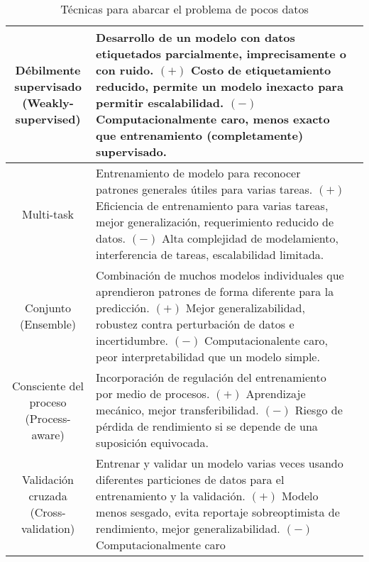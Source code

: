 \begin{center}
\begin{table}[ht!]
\begin{tabular}{ |c|m{9.5cm}|c| }
            \hline
            \makecell{Débilmente supervisado \\ (Weakly-supervised)} & Desarrollo de un modelo con datos etiquetados parcialmente, imprecisamente o con ruido. $(+)$ Costo de etiquetamiento reducido, permite un modelo inexacto para permitir escalabilidad. $(-)$ Computacionalmente caro, menos exacto que entrenamiento (completamente) supervisado. & \autocite{safonova-2023} \\
            \hline
            Multi-task & Entrenamiento de modelo para reconocer patrones generales útiles para varias tareas. $(+)$ Eficiencia de entrenamiento para varias tareas, mejor generalización, requerimiento reducido de datos. $(-)$ Alta complejidad de modelamiento, interferencia de tareas, escalabilidad limitada. & \autocite{safonova-2023} \\
            \hline
            Conjunto (Ensemble) & Combinación de muchos modelos individuales que aprendieron patrones de forma diferente para la predicción. $(+)$ Mejor generalizabilidad, robustez contra perturbación de datos e incertidumbre. $(-)$ Computacionalente caro, peor interpretabilidad que un modelo simple. & \autocite{safonova-2023} \\
            \hline
            \makecell{Consciente del proceso \\ (Process-aware)} & Incorporación de regulación del entrenamiento por medio de procesos. $(+)$ Aprendizaje mecánico, mejor transferibilidad. $(-)$ Riesgo de pérdida de rendimiento si se depende de una suposición equivocada. & \autocite{safonova-2023} \\
            \hline
            \makecell{Validación cruzada \\ (Cross-validation)} & Entrenar y validar un modelo varias veces usando diferentes particiones de datos para el entrenamiento y la validación. $(+)$ Modelo menos sesgado, evita reportaje sobreoptimista de rendimiento, mejor generalizabilidad. $(-)$ Computacionalmente caro & \autocite{safonova-2023} \\
            \hline
        \end{tabular}
        \caption{Técnicas para abarcar el problema de pocos datos}
        \label{table:2}
    \end{table}
\end{center}
